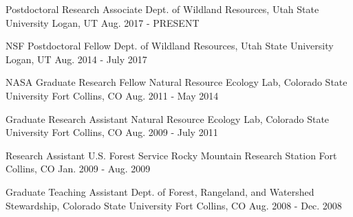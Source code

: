 

\begin{cventries}

  \eduentry
    {Postdoctoral Research Associate} %
    {Dept. of Wildland Resources, Utah State University} %
    {Logan, UT} %
    {Aug. 2017 - PRESENT} %

  \eduentry
    {NSF Postdoctoral Fellow} %
    {Dept. of Wildland Resources, Utah State University} %
    {Logan, UT} %
    {Aug. 2014 - July 2017} %

  \eduentry
    {NASA Graduate Research Fellow} %
    {Natural Resource Ecology Lab, Colorado State University} %
    {Fort Collins, CO} %
    {Aug. 2011 - May 2014} %

  \eduentry
    {Graduate Research Assistant} %
    {Natural Resource Ecology Lab, Colorado State University} %
    {Fort Collins, CO} %
    {Aug. 2009 - July 2011} %

  \eduentry
    {Research Assistant} %
    {U.S. Forest Service Rocky Mountain Research Station} %
    {Fort Collins, CO} %
    {Jan. 2009 - Aug. 2009} %

  \eduentry
    {Graduate Teaching Assistant} %
    {Dept. of Forest, Rangeland, and Watershed Stewardship, Colorado State University} %
    {Fort Collins, CO} %
    {Aug. 2008 - Dec. 2008} %

\end{cventries}
